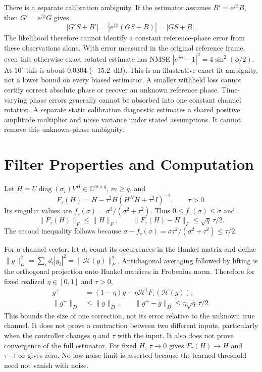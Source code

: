 \documentclass[journal]{IEEEtran}
\newcommand{\Hank}{\mathcal H}
\DeclareMathOperator{\diag}{diag}
\begin{document}
There is a separate calibration ambiguity. If the estimator assumes
$B'=e^{j\phi}B$, then $G'=e^{j\phi}G$ gives
\begin{equation}
 |G'S+B'|=|e^{j\phi}(GS+B)|=|GS+B|.
\end{equation}
The likelihood therefore cannot identify a constant reference-phase error
from these observations alone. With error measured in the original
reference frame, even this otherwise exact rotated estimate has NMSE
$|e^{j\phi}-1|^2=4\sin^2(\phi/2)$. At $10^\circ$ this is about
$0.0304$ ($-15.2$~dB). This is an illustrative exact-fit ambiguity, not
a lower bound on every biased estimator. A smaller withheld loss cannot
certify correct absolute phase or recover an unknown reference phase.
Time-varying phase errors generally cannot be absorbed into one constant
channel rotation. A separate static calibration diagnostic estimates a
shared positive amplitude multiplier and noise variance under stated
assumptions. It cannot remove this unknown-phase ambiguity.

\section{Filter Properties and Computation}
Let $H=U\diag(\sigma_i)V^H\in\mathbb C^{m\times q}$, $m\ge q$, and
\begin{equation}
 F_\tau(H)=H-\tau^2H(H^HH+\tau^2I)^{-1},\qquad\tau>0.
\end{equation}
Its singular values are $f_\tau(\sigma)=\sigma^3/(\sigma^2+\tau^2)$.
Thus $0\le f_\tau(\sigma)\le\sigma$ and
\begin{equation}
 \|F_\tau(H)\|_F\le\|H\|_F,\qquad
 \|F_\tau(H)-H\|_F\le\sqrt q\,\tau/2.
\end{equation}
The second inequality follows because
$\sigma-f_\tau(\sigma)=\sigma\tau^2/(\sigma^2+\tau^2)\le\tau/2$.

For a channel vector, let $d_i$ count its occurrences in the Hankel
matrix and define $\|g\|_D^2=\sum_i d_i|g_i|^2=\|\Hank(g)\|_F^2$.
Antidiagonal averaging followed by lifting is the orthogonal projection
onto Hankel matrices in Frobenius norm. Therefore for fixed realized
$\eta\in[0,1]$ and $\tau>0$,
\begin{align}
 g^+&=(1-\eta)g+\eta\Hank^\dagger F_\tau(\Hank(g)),\\
 \|g^+\|_D&\le\|g\|_D,\qquad
 \|g^+-g\|_D\le\eta\sqrt q\,\tau/2.
\end{align}
This bounds the size of one correction, not its error relative to the
unknown true channel. It does not prove a contraction between two
different inputs, particularly when the controller changes $\eta$ and
$\tau$ with the input. It also does not prove convergence of the full
estimator. For fixed $H$, $\tau\to0$ gives $F_\tau(H)\to H$ and
$\tau\to\infty$ gives zero. No low-noise limit is asserted because
the learned threshold need not vanish with noise.
\end{document}
